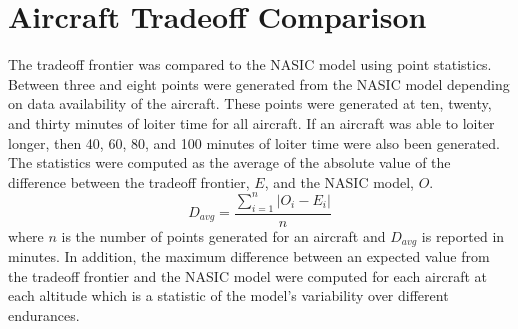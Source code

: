 \section{Aircraft Tradeoff Comparison}
The tradeoff frontier was compared to the NASIC model using point statistics. Between three and eight points were generated from the NASIC model depending on data availability of the aircraft. These points were generated at ten, twenty, and thirty minutes of loiter time for all aircraft. If an aircraft was able to loiter longer, then 40, 60, 80, and 100 minutes of loiter time were also been generated. The statistics were computed as the average of the absolute value of the difference between the tradeoff frontier, $E$, and the NASIC model, $O$.
\begin{equation}
    D_{avg} = \dfrac{\sum_{i = 1}^n |O_i-E_i|}{n}
\end{equation}
where $n$ is the number of points generated for an aircraft and $D_{avg}$ is reported in minutes. In addition, the maximum difference between an expected value from the tradeoff frontier and the NASIC model were computed for each aircraft at each altitude which is a statistic of the model's variability over different endurances.
\begin{table}[H]
\caption{Difference Statistics Between NASIC Model and Tradeoff Model}
\label{tab:diffstatistics}
\end{table}
